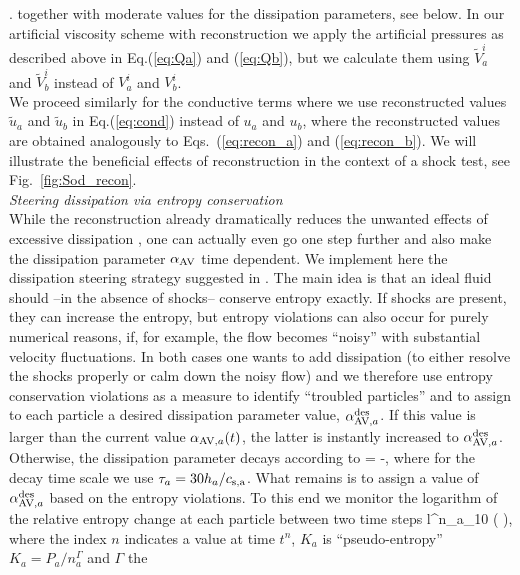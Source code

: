 \documentclass[useAMS,usenatbib]{iopart}
\begin{document}
 \right.
 \ee
together with moderate values for the dissipation parameters, see below.
In our artificial viscosity scheme with reconstruction
we  apply the artificial pressures as described above in Eq.(\ref{eq:Qa}) and (\ref{eq:Qb}), but we calculate them
using $\tilde{V}^i_a$ and $\tilde{V}^i_b$ instead of  $V^i_a$ and $V^i_b$. \\
We proceed similarly for the conductive terms where we use reconstructed values $\tilde{u}_a$ and $\tilde{u}_b$
in Eq.(\ref{eq:cond}) instead of $u_a$ and $u_b$, where the reconstructed values are obtained analogously to Eqs.~(\ref{eq:recon_a})
and (\ref{eq:recon_b}). We will illustrate the beneficial effects of reconstruction in the context of a shock test, see 
Fig.~\ref{fig:Sod_recon}.\\

{\em Steering dissipation via entropy conservation}\\
While the reconstruction already dramatically reduces the unwanted effects of excessive dissipation \cite{rosswog20a},
one can actually even go one step further and also make the dissipation parameter $\alpha_{\rm AV}$ time dependent. We implement
here the dissipation steering strategy suggested in \cite{rosswog20b}. The main idea is that an ideal fluid should --in the absence of shocks--
conserve entropy exactly. If shocks are present, they can increase the entropy, but entropy violations can also occur
for purely numerical reasons, if, for example, the flow becomes ``noisy'' with substantial velocity fluctuations. In both cases
one wants to add dissipation (to either resolve the shocks properly or calm down the noisy flow) and we therefore use
entropy conservation violations as a measure to identify ``troubled particles'' and to assign to each particle a desired 
dissipation parameter value, $\alpha_{{\rm AV}, a}^{\rm des}$. If this value is larger than the current value $\alpha_{{\rm AV}, a}(t)$,
the latter is instantly increased to $\alpha_{{\rm AV}, a}^{\rm des}$. Otherwise, the dissipation parameter  decays according to
\be
{}=  -,
\label{eq:davdt}
\ee
where for the decay time scale we use $\tau_a= 30 h_a/c_{\rm s,a}$. What remains is to assign a value of $\alpha_{{\rm AV}, a}^{\rm des}$
based on the entropy violations. To this end we monitor the logarithm of the relative entropy change at each particle between two time steps
\be
l^n_a\equiv \log_{10} \left( \right),
\ee
where the index $n$ indicates a value at time $t^n$, $K_a$ is ``pseudo-entropy'' $K_a= P_a/n_a^\Gamma$  and $\Gamma$ the
\end{document}
